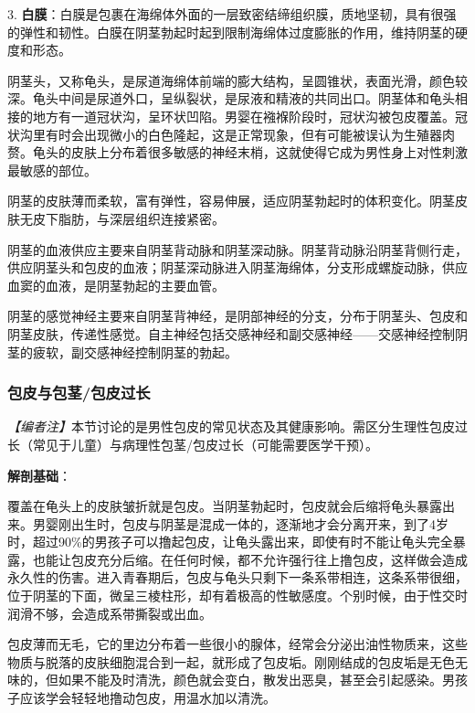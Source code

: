 \documentclass[12pt,a4paper,twoside]{ctexbook}
\begin{document}
3. \textbf{白膜}：白膜是包裹在海绵体外面的一层致密结缔组织膜，质地坚韧，具有很强的弹性和韧性。白膜在阴茎勃起时起到限制海绵体过度膨胀的作用，维持阴茎的硬度和形态。

阴茎头，又称龟头，是尿道海绵体前端的膨大结构，呈圆锥状，表面光滑，颜色较深。龟头中间是尿道外口，呈纵裂状，是尿液和精液的共同出口。阴茎体和龟头相接的地方有一道冠状沟，呈环状凹陷。男婴在襁褓阶段时，冠状沟被包皮覆盖。冠状沟里有时会出现微小的白色隆起，这是正常现象，但有可能被误认为生殖器肉赘。龟头的皮肤上分布着很多敏感的神经末梢，这就使得它成为男性身上对性刺激最敏感的部位。

阴茎的皮肤薄而柔软，富有弹性，容易伸展，适应阴茎勃起时的体积变化。阴茎皮肤无皮下脂肪，与深层组织连接紧密。

阴茎的血液供应主要来自阴茎背动脉和阴茎深动脉。阴茎背动脉沿阴茎背侧行走，供应阴茎头和包皮的血液；阴茎深动脉进入阴茎海绵体，分支形成螺旋动脉，供应血窦的血液，是阴茎勃起的主要血管。

阴茎的感觉神经主要来自阴茎背神经，是阴部神经的分支，分布于阴茎头、包皮和阴茎皮肤，传递性感觉。自主神经包括交感神经和副交感神经——交感神经控制阴茎的疲软，副交感神经控制阴茎的勃起。

\subsubsection{包皮与包茎/包皮过长}

\noindent\textit{【编者注】}本节讨论的是男性包皮的常见状态及其健康影响。需区分生理性包皮过长（常见于儿童）与病理性包茎/包皮过长（可能需要医学干预）。

\vspace{0.5em}
\noindent\textbf{解剖基础}：

覆盖在龟头上的皮肤皱折就是包皮。当阴茎勃起时，包皮就会后缩将龟头暴露出来。男婴刚出生时，包皮与阴茎是混成一体的，逐渐地才会分离开来，到了4岁时，超过90\%的男孩子可以撸起包皮，让龟头露出来，即使有时不能让龟头完全暴露，也能让包皮充分后缩。在任何时候，都不允许强行往上撸包皮，这样做会造成永久性的伤害。进入青春期后，包皮与龟头只剩下一条系带相连，这条系带很细，位于阴茎的下面，微呈三棱柱形，却有着极高的性敏感度。个别时候，由于性交时润滑不够，会造成系带撕裂或出血。

包皮薄而无毛，它的里边分布着一些很小的腺体，经常会分泌出油性物质来，这些物质与脱落的皮肤细胞混合到一起，就形成了包皮垢。刚刚结成的包皮垢是无色无味的，但如果不能及时清洗，颜色就会变白，散发出恶臭，甚至会引起感染。男孩子应该学会轻轻地撸动包皮，用温水加以清洗。
\end{document}
